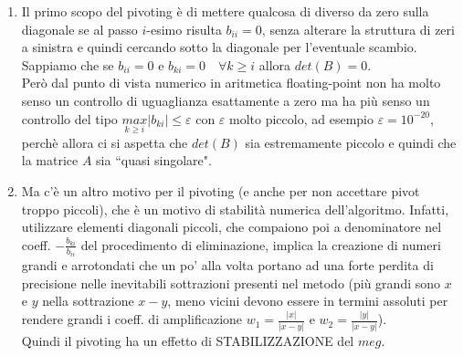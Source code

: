 \documentclass[12pt,a4paper]{article}
\begin{document}
\begin{enumerate}
\item Il primo scopo del pivoting è di mettere qualcosa di diverso da zero sulla diagonale se al passo $i$-esimo risulta $b_{ii}=0$, senza alterare la struttura di zeri a sinistra e quindi cercando sotto la diagonale per l'eventuale scambio.\\Sappiamo che se $b_{ii}=0$ e $b_{ki}=0\quad \forall k\geq i$ allora $det(B)=0$.\\Però dal punto di vista numerico in aritmetica floating-point non ha molto senso un controllo di uguaglianza esattamente a zero ma ha più senso un controllo del tipo $\underset{k\geq i}{max}|b_{ki}|\leq \varepsilon$ con $\varepsilon$ molto piccolo, ad esempio $\varepsilon=10^{-20}$, perchè allora ci si aspetta che $det(B)$ sia estremamente piccolo e quindi che la matrice $A$ sia ``quasi singolare".
\item Ma c'è un altro motivo per il pivoting (e anche per non accettare pivot troppo piccoli), che è un motivo di stabilità numerica dell'algoritmo. Infatti, utilizzare elementi diagonali piccoli, che compaiono poi a denominatore nel coeff. $-\frac{b_{ki}}{b_{ii}}$ del procedimento di eliminazione, implica la creazione di numeri grandi e arrotondati che un po' alla volta portano ad una forte perdita di precisione nelle inevitabili sottrazioni presenti nel metodo (più grandi sono $x$ e $y$ nella sottrazione $x-y$, meno vicini devono essere in termini assoluti per rendere grandi i coeff. di amplificazione $w_1=\frac{|x|}{|x-y|}$ e $w_2=\frac{|y|}{|x-y|}$).\\Quindi il pivoting ha un effetto di STABILIZZAZIONE del $meg$.\\\\
\end{enumerate}
\end{document}
